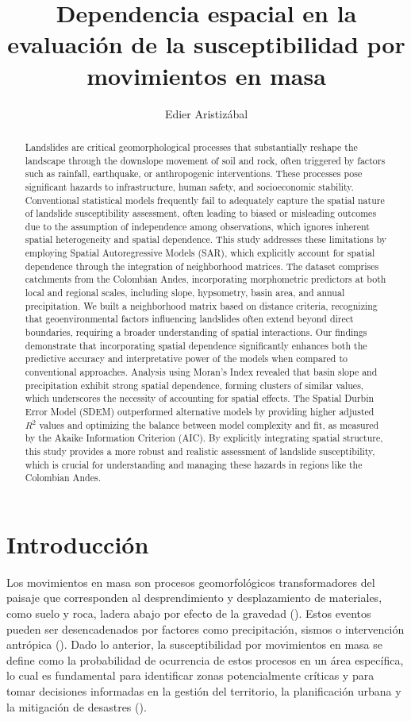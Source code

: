 \documentclass[
  manuscript=article,  
  layout=preprint,  
  year=2023,
  volume=0,
]{format}
\title{Dependencia espacial en la evaluación de la susceptibilidad por movimientos en masa}
\author{Edier Aristizábal}
\affiliation{Departamento de Geociencias y Medio Ambiente, Universidad Nacional de Colombia, Medellín, Colombia}
\begin{document}
\begin{abstract}
Landslides are critical geomorphological processes that substantially reshape the landscape through the downslope movement of soil and rock, often triggered by factors such as rainfall, earthquake, or anthropogenic interventions. These processes pose significant hazards to infrastructure, human safety, and socioeconomic stability. Conventional statistical models frequently fail to adequately capture the spatial nature of landslide susceptibility assessment, often leading to biased or misleading outcomes due to the assumption of independence among observations, which ignores inherent spatial heterogeneity and spatial dependence. This study addresses these limitations by employing Spatial Autoregressive Models (SAR), which explicitly account for spatial dependence through the integration of neighborhood matrices. The dataset comprises catchments from the Colombian Andes, incorporating morphometric predictors at both local and regional scales, including slope, hypsometry, basin area, and annual precipitation. We built a neighborhood matrix based on distance criteria, recognizing that geoenvironmental factors influencing landslides often extend beyond direct boundaries, requiring a broader understanding of spatial interactions. Our findings demonstrate that incorporating spatial dependence significantly enhances both the predictive accuracy and interpretative power of the models when compared to conventional approaches. Analysis using Moran's Index revealed that basin slope and precipitation exhibit strong spatial dependence, forming clusters of similar values, which underscores the necessity of accounting for spatial effects. The Spatial Durbin Error Model (SDEM) outperformed alternative models by providing higher adjusted $R^2$ values and optimizing the balance between model complexity and fit, as measured by the Akaike Information Criterion (AIC). By explicitly integrating spatial structure, this study provides a more robust and realistic assessment of landslide susceptibility, which is crucial for understanding and managing these hazards in regions like the Colombian Andes.

\end{abstract}

\section{Introducción}

Los movimientos en masa son procesos geomorfológicos transformadores del paisaje que corresponden al desprendimiento y desplazamiento de materiales, como suelo y roca, ladera abajo por efecto de la gravedad (\cite{soeters1996slope, brabb1984innovative}). Estos eventos pueden ser desencadenados por factores como precipitación, sismos o intervención antrópica (\cite{corominas2014recommendations, fell2008guidelines}). Dado lo anterior, la susceptibilidad por movimientos en masa se define como la probabilidad de ocurrencia de estos procesos en un área específica, lo cual es fundamental para identificar zonas potencialmente críticas y para tomar decisiones informadas en la gestión del territorio, la planificación urbana y la mitigación de desastres (\cite{brabb1984innovative, corominas2014recommendations}).
\end{document}
